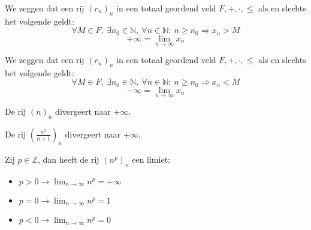 \documentclass[main.tex]{subfiles}
\begin{document}
\begin{de}
  We zeggen dat een rij $(r_{n})_{n}$ in een totaal geordend veld $F,+,\cdot,\le$  als en slechts het volgende geldt:
  \[ \forall M\in F,\ \exists n_{0}\in \mathbb{N},\ \forall n\in \mathbb{N}:\ n \ge n_{0} \Rightarrow x_{n} > M \]
  \[ + \infty = \lim_{n\rightarrow \infty}x_{n}\]
\end{de}

\begin{de}
  We zeggen dat een rij $(r_{n})_{n}$ in een totaal geordend veld $F,+,\cdot,\le$  als en slechts het volgende geldt:
  \[ \forall M\in F,\ \exists n_{0}\in \mathbb{N},\ \forall n\in \mathbb{N}:\ n \ge n_{0} \Rightarrow x_{n} < M \]
  \[ - \infty = \lim_{n\rightarrow \infty}x_{n}\]
\end{de}

\begin{vb}
  De rij $(n)_{n}$ divergeert naar $+\infty$.
\end{vb}

\begin{vb}
  De rij $\left(\frac{n^{2}}{n+1}\right)_{n}$ divergeert naar $+\infty$.
\end{vb}

\begin{bpr}
  Zij $p\in \mathbb{Z}$, dan heeft de rij $(n^{p})_{n}$ een limiet:
  \begin{itemize}
  \item $p>0 \rightarrow \lim_{n\rightarrow \infty}n^{p} = + \infty$
  \item $p=0 \rightarrow \lim_{n\rightarrow \infty}n^{p} = 1$
  \item $p<0 \rightarrow \lim_{n\rightarrow \infty}n^{p} = 0$
  \end{itemize}
\end{bpr}
\end{document}
